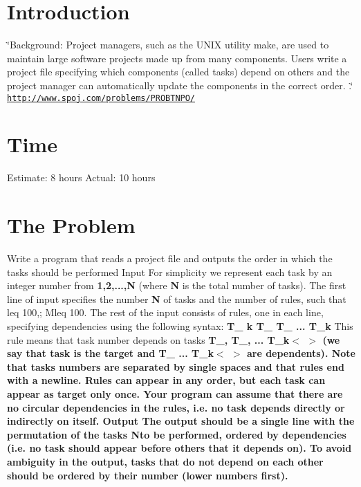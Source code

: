 \hypertarget{index_intro_sec}{}\section{Introduction}\label{index_intro_sec}
\char`\"{}\+Background\+:
\+Project managers, such as the U\+N\+I\+X utility make, are used to maintain large software projects made up from many components. Users write a project file specifying which components (called tasks) depend on others and the project manager can automatically update the components in the correct order. .\char`\"{} \href{http://www.spoj.com/problems/PROBTNPO/}{\tt http\+://www.\+spoj.\+com/problems/\+P\+R\+O\+B\+T\+N\+P\+O/} \hypertarget{index_time_est}{}\section{Time}\label{index_time_est}
Estimate\+: 8 hours Actual\+: 10 hours\hypertarget{index_install_sec}{}\section{The Problem}\label{index_install_sec}
Write a program that reads a project file and outputs the order in which the tasks should be performed Input For simplicity we represent each task by an integer number from {\bfseries 1,2,...,N} (where {\bfseries N} is the total number of tasks). The first line of input specifies the number {\bfseries N} of tasks and the number  of rules, such that  leq 100,; Mleq 100. The rest of the input consists of  rules, one in each line, specifying dependencies using the following syntax\+: {\bfseries  T\+\_ k T\+\_ T\+\_ ... T\+\_\+k} This rule means that task number  depends on  tasks {\bfseries T\+\_, T\+\_, ... T\+\_\+k$<${\bfseries } $>$ (we say that task  is the target and {\bfseries T\+\_ ... T\+\_\+k$<${\bfseries } $>$ are dependents). Note that tasks numbers are separated by single spaces and that rules end with a newline. Rules can appear in any order, but each task can appear as target only once. Your program can assume that there are no circular dependencies in the rules, i.\+e. no task depends directly or indirectly on itself. Output The output should be a single line with the permutation of the tasks  N{\bfseries to} be performed, ordered by dependencies (i.\+e. no task should appear before others that it depends on). To avoid ambiguity in the output, tasks that do not depend on each other should be ordered by their number (lower numbers first). }}